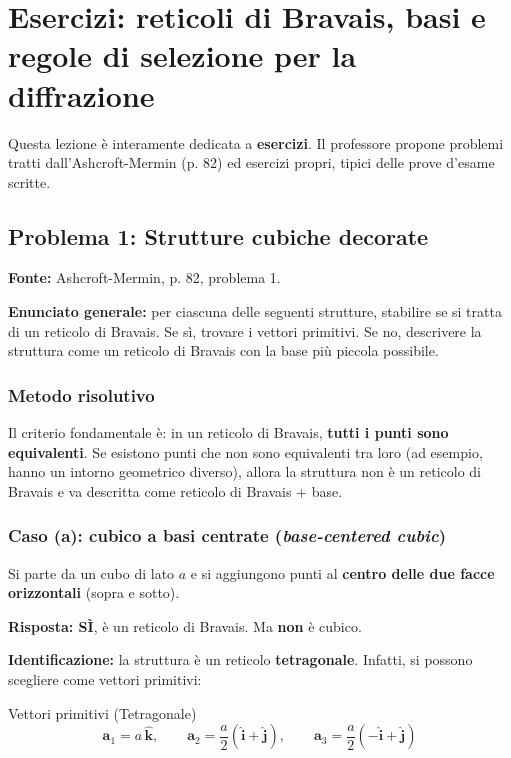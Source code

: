 \chapter{Esercizi: reticoli di Bravais, basi e regole di selezione per la diffrazione}


\begin{nota}
Questa lezione è interamente dedicata a \textbf{esercizi}. Il professore propone problemi tratti dall'Ashcroft-Mermin (p. 82) ed esercizi propri, tipici delle prove d'esame scritte.
\end{nota}

\section{Problema 1: Strutture cubiche decorate}

\textbf{Fonte:} Ashcroft-Mermin, p. 82, problema 1.

\textbf{Enunciato generale:} per ciascuna delle seguenti strutture, stabilire se si tratta di un reticolo di Bravais. Se sì, trovare i vettori primitivi. Se no, descrivere la struttura come un reticolo di Bravais con la base più piccola possibile.

\subsection*{Metodo risolutivo}

Il criterio fondamentale è: in un reticolo di Bravais, \textbf{tutti i punti sono equivalenti}. Se esistono punti che non sono equivalenti tra loro (ad esempio, hanno un intorno geometrico diverso), allora la struttura non è un reticolo di Bravais e va descritta come reticolo di Bravais + base.

\subsection*{Caso (a): cubico a basi centrate (\textit{base-centered cubic})}

Si parte da un cubo di lato $a$ e si aggiungono punti al \textbf{centro delle due facce orizzontali} (sopra e sotto).

\textbf{Risposta: SÌ}, è un reticolo di Bravais. Ma \textbf{non} è cubico.

\textbf{Identificazione:} la struttura è un reticolo \textbf{tetragonale}. Infatti, si possono scegliere come vettori primitivi:

\begin{equazione}{Vettori primitivi (Tetragonale)}
\begin{equation}
\mathbf{a}_1 = a\,\hat{\mathbf{k}}, \qquad \mathbf{a}_2 = \frac{a}{2}(\hat{\mathbf{i}} + \hat{\mathbf{j}}), \qquad \mathbf{a}_3 = \frac{a}{2}(-\hat{\mathbf{i}} + \hat{\mathbf{j}})
\end{equation}
\end{equazione}


